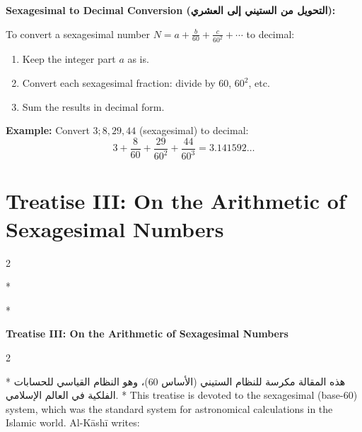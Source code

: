 \documentclass[11pt,a4paper]{article}
\newcommand{\ar}[1]{{\arabicfont\beginR #1\endR}}
\newenvironment{bilingual}{%
  \vspace{0.3em}%
  \begin{paracol}{2}%
}{%
  \end{paracol}%
  \vspace{0.3em}%
}
\newenvironment{mathalgo}{%
  \par\vspace{0.3cm}
  \begin{framed}
  \setlength{\parindent}{0pt}
}{%
  \end{framed}
  \par\vspace{0.3cm}
}
\begin{document}
\begin{mathalgo}
\textbf{Sexagesimal to Decimal Conversion (\ar{التحويل من الستيني إلى العشري}):}

To convert a sexagesimal number $N = a + \frac{b}{60} +
\frac{c}{60^2} + \cdots$ to decimal:
\begin{enumerate}[nosep]
  \item Keep the integer part $a$ as is.
  \item Convert each sexagesimal fraction: divide by $60$, $60^2$, etc.
  \item Sum the results in decimal form.
\end{enumerate}

\textbf{Example:} Convert $3; 8, 29, 44$ (sexagesimal) to decimal:
\[
3 + \frac{8}{60} + \frac{29}{60^2} + \frac{44}{60^3} = 3.141592\ldots
\]
\end{mathalgo}
\clearpage


\section{Treatise III: On the Arithmetic of Sexagesimal Numbers}
\label{sec:treatise3}

\begin{bilingual}
\switchcolumn[0]*
\begin{center}
\textbf{\Large\color{chapcolor}\ar{المقالة الثالثة في حساب الدرج والدقائق والثواني}}
\end{center}
\switchcolumn[1]*
\begin{center}
\textbf{\Large\color{chapcolor}Treatise III: On the Arithmetic of Sexagesimal Numbers}
\end{center}
\end{bilingual}

\begin{bilingual}
\switchcolumn[0]*
\ar{هذه المقالة مكرسة للنظام الستيني (الأساس 60)، وهو النظام القياسي للحسابات الفلكية في العالم الإسلامي.}
\switchcolumn[1]*
This treatise is devoted to the sexagesimal (base-60) system,
which was the standard system for astronomical calculations in the
Islamic world. Al-K\=ash\=i writes:
\end{bilingual}
\end{document}
